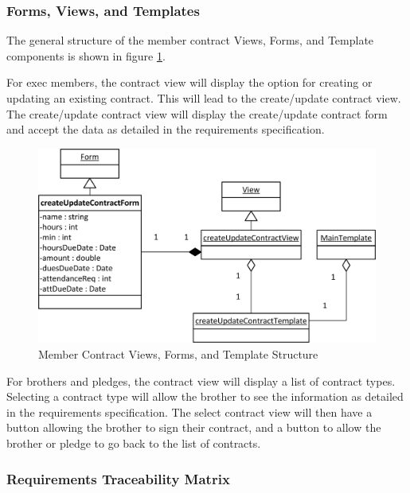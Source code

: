 \documentclass{article}
\begin{document}
\subsubsection{Forms, Views, and Templates}

The general structure of the member contract Views, Forms, and Template components is shown in figure \ref{fig:memberContractViewFormTemplateDiagram}.

For exec members, the contract view will display the option for creating or updating an existing contract. This will lead to the create/update contract view. The create/update contract view will display the create/update contract form and accept the data as detailed in the requirements specification.

\FloatBarrier
\begin{figure}[h!]
\centering
\includegraphics[scale=.65]{img/viewFormTemplateDiagrams/createUpdateContract}
\caption{Member Contract Views, Forms, and Template Structure}
\label{fig:memberContractViewFormTemplateDiagram}
\end{figure}
\FloatBarrier

For brothers and pledges, the contract view will display a list of contract types. Selecting a contract type will allow the brother to see the information as detailed in the requirements specification. The select contract view will then have a button allowing the brother to sign their contract, and a button to allow the brother or pledge to go back to the list of contracts.

\subsubsection{Requirements Traceability Matrix}
\end{document}
